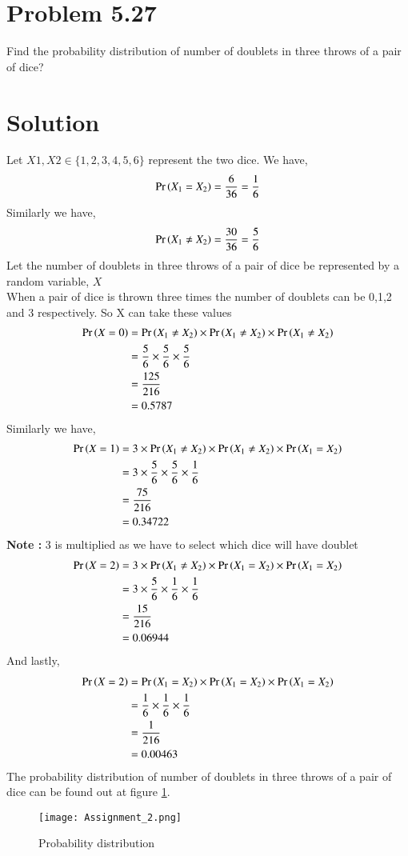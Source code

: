 \documentclass[journal,12pt,twocolumn]{IEEEtran}
\begin{document}
\section*{Problem 5.27}
Find the probability distribution of number of doublets in three throws of a pair of dice?
\section*{Solution}
Let $X1, X2 \in \{1, 2, 3, 4, 5, 6\}$ represent the two dice.
We have,
$$\Pr\left(X_1 =X_2\right) = \frac{6}{36} = \frac{1}{6}$$
Similarly we have, 
$$\Pr\left(X_1 \neq X_2\right) = \frac{30}{36} = \frac{5}{6}$$
Let the number of doublets in three throws of a pair of dice be represented by a random variable, $X$ \\
When a pair of dice is thrown three times the number of doublets can be 0,1,2 and 3 respectively. So X can take these values
\begin{align}
    \Pr\left(X =0\right) &= \Pr\left(X_1 \neq X_2\right) \times \Pr\left(X_1 \neq X_2\right) \times \Pr\left(X_1 \neq X_2\right)   \\
        &=  \frac{5}{6} \times \frac{5}{6} \times \frac{5}{6} \\
        & = \frac{125}{216} \\
        & = 0.5787
\end{align}
Similarly we have, 
\begin{align}
    \Pr\left(X =1\right) &= 3 \times \Pr\left(X_1 \neq X_2\right) \times \Pr\left(X_1 \neq X_2\right) \times \Pr\left(X_1 = X_2\right)   \\
        &=  3\times \frac{5}{6} \times \frac{5}{6} \times \frac{1}{6} \\
        & = \frac{75}{216} \\
        & = 0.34722
\end{align}
\textbf{Note :} 3 is multiplied as we have to select which dice will have doublet
\begin{align}
    \Pr\left(X =2\right) &= 3 \times \Pr\left(X_1 \neq X_2\right) \times \Pr\left(X_1 = X_2\right) \times \Pr\left(X_1 = X_2\right)   \\
        &=  3\times \frac{5}{6} \times \frac{1}{6} \times \frac{1}{6} \\
        & = \frac{15}{216} \\
        & = 0.06944
\end{align}
And lastly,
\begin{align}
    \Pr\left(X =2\right) &= \Pr\left(X_1 = X_2\right) \times \Pr\left(X_1 = X_2\right) \times \Pr\left(X_1 = X_2\right)   \\
        &=   \frac{1}{6} \times \frac{1}{6} \times \frac{1}{6} \\
        & = \frac{1}{216} \\
        & = 0.00463
\end{align}
The probability distribution of number of doublets in three throws of a pair of dice can be found out at figure \ref{Probability distribution}. 
\begin{figure}[h!]
    \centering
    \texttt{[image: Assignment\_2.png]}
    \caption{Probability distribution}
    \label{Probability distribution}
\end{figure}
\end{document}
